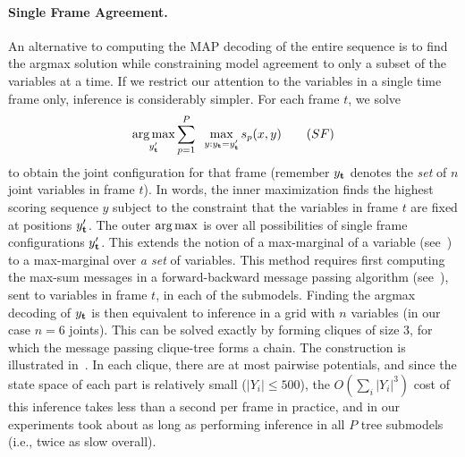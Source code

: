 \paragraph{Single Frame Agreement.} An alternative to computing the
MAP decoding of the entire sequence is to find the argmax solution
while constraining model agreement to only a subset of the variables
at a time.  If we restrict our attention to the variables in a single
time frame only, inference is considerably simpler.  For each frame
$t$, we solve
\begin{equation}
\mathop{\arg\max}_{y_{\bf{t}}'} \sum_{p=1}^P \;\; \max_{y : y_{\bf{t}} = y_{\bf{t}}'} s_p(x,y) \quad{}\quad{(SF)}
\end{equation}
to obtain the joint configuration for that frame (remember $y_{\bf t}$
denotes the {\em set} of $n$ joint variables in frame $t$).  In words,
the inner maximization finds the highest scoring sequence $y$ subject to
the constraint that the variables in frame $t$ are fixed at positions
$y_{\bf t}'$.  The outer $\mathop{\arg\max}$ is over all possibilities of single
frame configurations $y_{\bf t}'$.  This extends the notion of a
max-marginal of a variable (see~) to a max-marginal
over {\em a set} of variables.  This method requires first computing
the max-sum messages in a forward-backward message passing algorithm (see~), sent to variables in frame $t$, in each of the submodels.  Finding the argmax decoding of $y_{\bf t}$ is then
equivalent to inference in a grid with $n$ variables (in our case $n=6$
joints).  This can be solved exactly by forming cliques of size 3, for
which the message passing clique-tree forms a chain. The construction is 
illustrated in~.  In each clique,
there are at most pairwise potentials, and since the state space of
each part is relatively small ($|Y_i| \leq 500$), the $O(\sum_i |Y_i|^3)$ cost 
of this inference takes less than a second per frame in
practice, and in our experiments took about as long as performing inference in 
all $P$ tree submodels (i.e., twice as slow overall).

